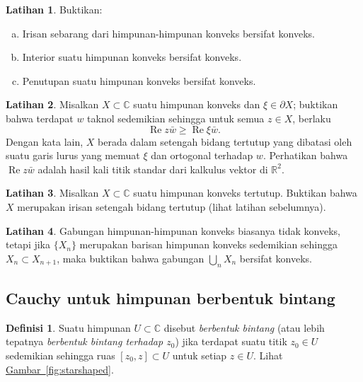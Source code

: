 \documentclass[12pt,openany]{book}
\renewcommand{\Re}{\operatorname{Re}}
\newcommand{\C}{{\mathbb{C}}}
\newcommand{\R}{{\mathbb{R}}}
\newcommand{\myindex}[1]{#1\index{#1}}
\theoremstyle{plain}
\theoremstyle{remark}
\theoremstyle{definition}
\newtheorem{defn}[thm]{Definisi}
\newenvironment{exbox}{%
    \def\FrameCommand{\vrule width 1pt \relax\hspace{10pt}}%
    \MakeFramed{\advance\hsize-\width\FrameRestore}%
}{%
    \endMakeFramed
}
\newenvironment{exparts}{%
    \leavevmode\begin{enumerate}[a),noitemsep,topsep=0pt,parsep=0pt,partopsep=0pt]
}{%
    \end{enumerate}
}
\theoremstyle{exercise}
\newtheorem{exercise}{Latihan}[section]
\theoremstyle{example}
\newcommand{\figureref}[1]{\hyperref[#1]{Gambar~\ref*{#1}}}
\begin{document}
\begin{exbox}
\begin{exercise}
Buktikan:
\begin{exparts}
\item
Irisan sebarang dari himpunan-himpunan konveks bersifat konveks.
\item
Interior suatu himpunan konveks bersifat konveks.
\item
Penutupan suatu himpunan konveks bersifat konveks.
\end{exparts}
\end{exercise}

\begin{exercise}
Misalkan $X \subset \C$ suatu himpunan konveks dan $\xi \in \partial X$; buktikan bahwa
terdapat $w$ taknol sedemikian sehingga untuk semua $z \in X$, berlaku
\begin{equation*}
\Re z\bar{w} \geq \Re \xi\bar{w} .
\end{equation*}
Dengan kata lain, $X$ berada dalam setengah bidang tertutup
yang dibatasi oleh suatu garis lurus yang memuat $\xi$ dan
ortogonal terhadap $w$.
Perhatikan bahwa $\Re z\bar{w}$ adalah hasil kali titik standar dari
kalkulus vektor di $\R^2$.
\end{exercise}

\begin{exercise}
Misalkan $X \subset \C$ suatu himpunan konveks tertutup.
Buktikan bahwa $X$ merupakan irisan setengah bidang tertutup (lihat
latihan sebelumnya).
\end{exercise}

\begin{exercise}
Gabungan himpunan-himpunan konveks biasanya tidak konveks, tetapi jika $\{ X_n \}$ merupakan
barisan himpunan konveks sedemikian sehingga $X_n \subset X_{n+1}$, maka
buktikan bahwa gabungan $\bigcup_n X_n$ bersifat konveks.
\end{exercise}
\end{exbox}

\subsection{Cauchy untuk himpunan berbentuk bintang}

\begin{defn}
Suatu himpunan $U \subset \C$ disebut \emph{\myindex{berbentuk bintang}} (atau lebih tepatnya
\emph{berbentuk bintang terhadap $z_0$}) jika terdapat suatu
titik $z_0 \in U$ sedemikian sehingga ruas $[z_0,z] \subset U$ untuk setiap
$z \in U$.  Lihat \figureref{fig:starshaped}.
\end{defn}
\end{document}
